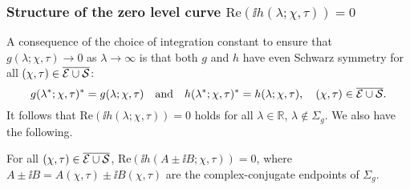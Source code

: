 \subsubsection{Structure of the zero level curve $\mathrm{Re}(\ii h(\lambda;\chi,\tau))=0$}
\label{sec:zero-level-curve}
A consequence of the choice of integration constant to ensure that $g(\lambda;\chi,\tau)\to 0$ as $\lambda\to\infty$ is that both $g$ and $h$ have even Schwarz symmetry for all $(\chi,\tau)\in \overline{\mathcal{E}\cup\mathcal{S}}$:
\begin{equation}
g(\lambda^*;\chi,\tau)^*=g(\lambda;\chi,\tau)\quad\text{and}\quad h(\lambda^*;\chi,\tau)^*=h(\lambda;\chi,\tau),\quad (\chi,\tau)\in \overline{\mathcal{E}\cup\mathcal{S}}.
\label{eq:g-h-Schwarz}
\end{equation}
It follows that $\mathrm{Re}(\ii h(\lambda;\chi,\tau))=0$ holds for all $\lambda\in\mathbb{R}$, $\lambda\not\in\Sigma_g$.  We also have the following.
\begin{lemma}
For all $(\chi,\tau)\in \overline{\mathcal{E}\cup\mathcal{S}}$, $\mathrm{Re}(\ii h(A\pm\ii B;\chi,\tau))=0$, where $A\pm\ii B=A(\chi,\tau)\pm\ii B(\chi,\tau)$ are the complex-conjugate endpoints of $\Sigma_g$.
\label{lem:h-imaginary-at-branch-points}
\end{lemma}
